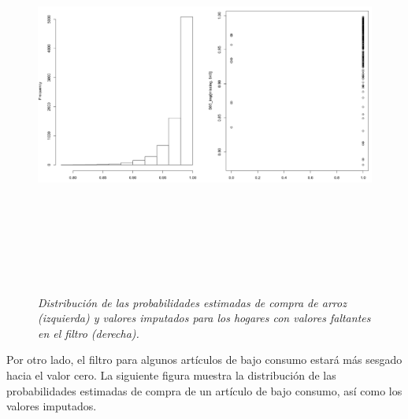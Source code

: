 \documentclass[
  10pt,
  spanish,
]{book}
\begin{document}
\begin{figure}
\centering
\includegraphics[width=\textwidth,height=5.20833in]{Pics/11.png}
\caption{\emph{Distribución de las probabilidades estimadas de compra de arroz (izquierda) y valores imputados para los hogares con valores faltantes en el filtro (derecha).}}
\end{figure}

Por otro lado, el filtro para algunos artículos de bajo consumo estará más sesgado hacia el valor cero. La siguiente figura muestra la distribución de las probabilidades estimadas de compra de un artículo de bajo consumo, así como los valores imputados.
\end{document}
